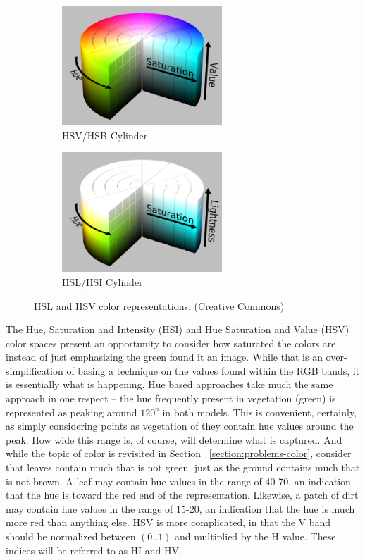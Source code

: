 \documentclass[letterpaper]{report}
\begin{document}
{\begin{figure}[H]
	\centering
	\begin{subfigure}[h]{.45\textwidth}
		\centering
		\includegraphics[width=6cm]{./figures/HSV_color_solid_cylinder_saturation_gray.png}
		\caption{HSV/HSB Cylinder}
		\label{fig:hsv}
	\end{subfigure}
	\hfill
	\begin{subfigure}[h]{.45\textwidth}
		\centering
		\includegraphics[width=6cm]{./figures/HSL_color_solid_cylinder_saturation_gray.png}
		\caption{HSL/HSI Cylinder}
		\label{fig:hsl}
	\end{subfigure}
	\caption[HSL and HSV color representations]{HSL and HSV color representations. (Creative Commons)}
	\label{fig:overlap}
\end{figure}



The Hue, Saturation and Intensity (HSI) and Hue Saturation and Value (HSV) color spaces present an opportunity to consider how saturated the colors are instead of just emphasizing the green found it an image. While that is  an over-simplification of basing a technique on the values found within the RGB bands, it is essentially what is happening. Hue based approaches take much the same approach in one respect -- the hue frequently present in vegetation (green) is represented as peaking around $120^o$ in both models. This is convenient, certainly, as simply considering points as vegetation of they contain hue values around the peak. How wide this range is, of course, will determine what is captured. And while the topic of color is revisited in Section ~\ref{section:problems-color}, consider that leaves contain much that is not green, just as the ground contains much that is not brown. A leaf may contain hue values in the range of 40-70, an indication that the hue is toward the red end of the representation. Likewise, a patch of dirt may contain hue values in the range of 15-20, an indication that the hue is much more red than anything else. HSV is  more complicated, in that the V band should be normalized between $(0..1)$ and multiplied by the H value. These indices will be referred to as HI and HV. 

}
\end{document}
